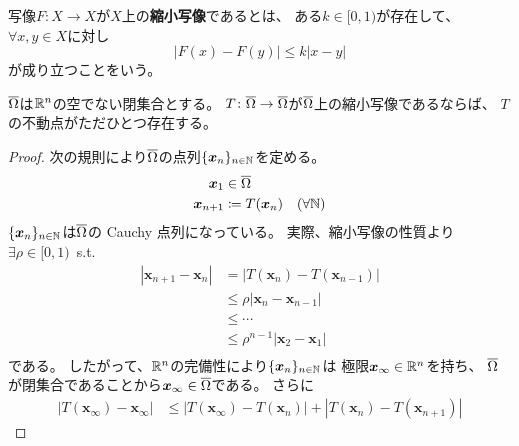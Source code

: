 \documentclass[report]{jlreq}
\begin{document}
\begin{definition}[縮小写像]
    写像$F \colon X \to X$が$X$上の\textbf{縮小写像}であるとは、
    ある$k \in [0, 1)$が存在して、$\forall x, y \in X$に対し
    \begin{equation}
        |F(x) - F(y)| \le k |x - y|
    \end{equation}
    が成り立つことをいう。
\end{definition}

\begin{theorem}[Banachの縮小写像の原理]
    $\overline{\Omega}$は$\mathbb{R}^n$の空でない閉集合とする。
    $T \colon \overline{\Omega} \to \overline{\Omega}$が$\overline{\Omega}$上の縮小写像であるならば、
    $T$の不動点がただひとつ存在する。
    \label{6:thm:2}
\end{theorem}

\begin{proof}
    次の規則により$\overline{\Omega}$の点列$\{ \bm{x}_n \}_{n \in \mathbb{N}}$を定める。
    \begin{equation}
        \begin{split}
            \bm{x}_1 &\in \overline{\Omega} \\
            \bm{x}_{n+1} &\coloneqq T(\bm{x}_n) \quad (\text{$\forall \mathbb{N}$})
        \end{split}
    \end{equation}
    $\{ \bm{x}_n \}_{n \in \mathbb{N}}$は$\overline{\Omega}$の Cauchy 点列になっている。
    実際、縮小写像の性質より$\exists \rho \in [0, 1)$\, s.t.
    \begin{equation}
        \begin{split}
            |\bm{x}_{n+1} - \bm{x}_n|
                &= |T(\bm{x}_{n}) - T(\bm{x}_{n-1})| \\
                &\le \rho |\bm{x}_{n} - \bm{x}_{n-1}| \\
                &\le \cdots \\
                &\le \rho^{n-1} |\bm{x}_{2} - \bm{x}_{1}| \\
        \end{split}
    \end{equation}
    である。
    したがって、$\mathbb{R}^n$の完備性により$\{ \bm{x}_n \}_{n \in \mathbb{N}}$は
    極限$\bm{x}_\infty \in \mathbb{R}^n$を持ち、
    $\overline{\Omega}$が閉集合であることから$\bm{x}_\infty \in \overline{\Omega}$である。
    さらに
    \begin{equation}
        \begin{split}
            |T(\bm{x}_\infty) - \bm{x}_\infty|
                &\le |T(\bm{x}_\infty) - T(\bm{x}_n)|
                    + |T(\bm{x}_n) - T(\bm{x}_{n+1})|

\end{split}
\end{equation}
\end{proof}
\end{document}
